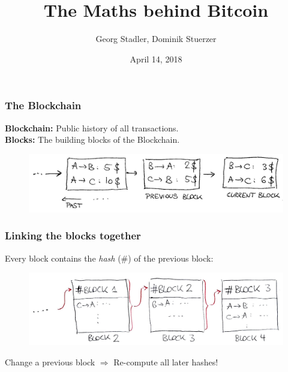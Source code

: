 \documentclass[12pt]{beamer}
\title{{\bf The Maths behind Bitcoin }}
\date{April 14, 2018}
\author{Georg Stadler, Dominik Stuerzer}
\theoremstyle{definition}
\numberwithin{equation}{section}
\begin{document}
\begin{frame}
\maketitle
\end{frame}

\begin{frame}
\frametitle{The Blockchain}
\textbf{Blockchain:} Public history of all transactions.\\
\textbf{Blocks:} The building blocks of the Blockchain.


%   
\begin{figure}
\includegraphics[scale=0.2, trim = {45mm 0mm 0mm 0mm}]{fig1}
\end{figure}
\end{frame}

\begin{frame}
\frametitle{Linking the blocks together}
Every block contains the \emph{hash} (\#) of the previous block:

\begin{figure}
\includegraphics[scale=0.25, trim = {40mm 0mm 0mm 0mm}]{fig2.jpg}
\end{figure}
\pause
Change a previous block $\Rightarrow$ Re-compute all later hashes!

\end{frame}
\end{document}
